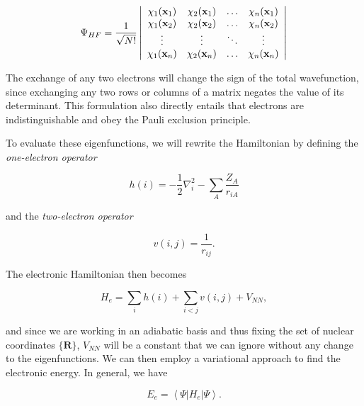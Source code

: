 \documentclass[12pt,letter,footinclude=true,headinclude=true,hyphens]{book} %
\begin{document}
    \begin{equation}
    \Psi_{HF} = \frac{1}{\sqrt{N!}}\left| \begin{array}{cccc}
        \chi_1(\mathbf{x}_1) & \chi_2(\mathbf{x}_1) & \mathellipsis & \chi_n(\mathbf{x}_1)  \\
        \chi_1(\mathbf{x}_2) & \chi_2(\mathbf{x}_2) & \mathellipsis & \chi_n(\mathbf{x}_2)  \\
        \vdots & \vdots & \ddots & \vdots  \\
        \chi_1(\mathbf{x}_n) & \chi_2(\mathbf{x}_n) & \mathellipsis & \chi_n(\mathbf{x}_n)  \end{array} \right|
    \end{equation}
    
    The exchange of any two electrons will change the sign of the total wavefunction, since exchanging any two rows or columns of a matrix negates the value of its determinant. This formulation also directly entails that electrons are indistinguishable and obey the Pauli exclusion principle.
    
    To evaluate these eigenfunctions, we will rewrite the Hamiltonian by defining the \emph{one-electron operator}
    
    \begin{equation}
    h(i) = -\frac{1}{2}\nabla_i^2 - \sum_A \frac{Z_A}{r_{iA}}
    \end{equation}
    
    and the \emph{two-electron operator}
    
    \begin{equation}
    v(i,j) = \frac{1}{r_{ij}}.
    \end{equation}
    
    The electronic Hamiltonian then becomes
    
    \begin{equation}
    H_e = \sum_i h(i) + \sum_{i < j} v(i,j) + V_{NN},
    \end{equation}
    
    and since we are working in an adiabatic basis and thus fixing the set of nuclear coordinates $\{\mathbf{R}\}$, $V_{NN}$ will be a constant that we can ignore without any change to the eigenfunctions. We can then employ a variational approach to find the electronic energy. In general, we have
    
    \begin{equation}
    E_e = \left < \Psi | H_e | \Psi \right >.
    \end{equation}
    
\end{document}
